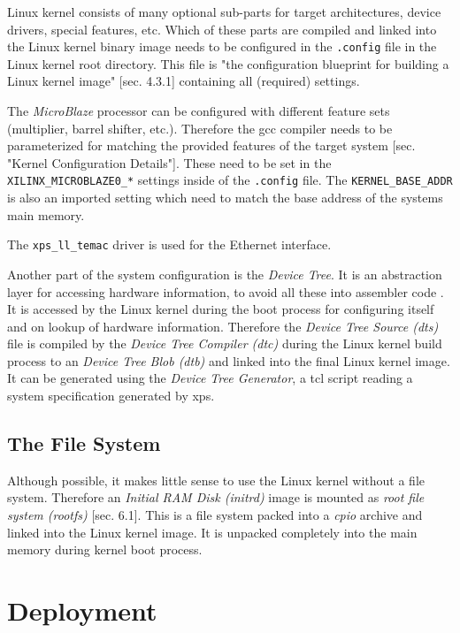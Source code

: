 Linux kernel consists of many optional sub-parts for target architectures, device drivers, special features, etc. Which of these parts are compiled and linked into the Linux kernel binary image needs to be configured in the \texttt{.config} file in the Linux kernel root directory. This file is "the configuration blueprint for building a Linux kernel image" \cite{linuxPrimer}[sec. 4.3.1] containing all (required) settings.

The \textit{MicroBlaze} processor can be configured with different feature sets (multiplier, barrel shifter, etc.). Therefore the \gls{gcc} compiler needs to be parameterized for matching the provided features of the target system \cite{mb_linux}[sec. "Kernel Configuration Details"]. These need to be set in the \texttt{XILINX\_MICROBLAZE0\_*} settings inside of the \texttt{.config} file. The \texttt{KERNEL\_BASE\_ADDR} is also an imported setting which need to match the base address of the systems main memory.

The \texttt{xps\_ll\_temac} driver is used for the Ethernet interface.

Another part of the system configuration is the \textit{Device Tree}. It is an abstraction layer for accessing hardware information, to avoid all these into assembler code \cite{device_tree}. It is accessed by the Linux kernel during the boot process for configuring itself and on lookup of hardware information. Therefore the \textit{Device Tree Source (dts)} file is compiled by the \textit{Device Tree Compiler (dtc)} during the Linux kernel build process to an \textit{Device Tree Blob (dtb)} and linked into the final Linux kernel image. It can be generated using the \textit{Device Tree Generator}, a \gls{tcl} script reading a system specification generated by \gls{xps}.

\subsection{The File System}
\label{subsec:fs}

Although possible, it makes little sense to use the Linux kernel without a file system. Therefore an \textit{Initial RAM Disk (initrd)} image is mounted as \textit{root file system (rootfs)} \cite{linuxPrimer}[sec. 6.1]. This is a file system packed into a \textit{cpio} archive and linked into the Linux kernel image. It is unpacked completely into the main memory during kernel boot process.

\section{Deployment}

